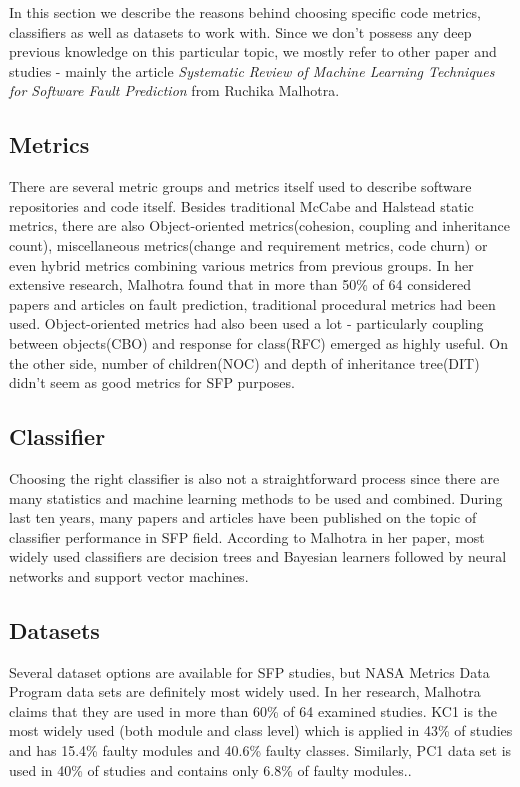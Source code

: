 In this section we describe the reasons behind choosing specific code metrics, classifiers as well as datasets to work with. Since we don't possess any deep previous knowledge on this particular topic, we mostly refer to other paper and studies - mainly the article \textit{Systematic Review of Machine Learning Techniques for Software Fault Prediction}\cite{malhotra2015systematic} from Ruchika Malhotra.

\subsection{Metrics}
There are several metric groups and metrics itself used to describe software repositories and code itself. Besides traditional McCabe and Halstead static metrics, there are also Object-oriented metrics(cohesion, coupling and inheritance count), miscellaneous metrics(change and requirement metrics, code churn) or even hybrid metrics combining various metrics from previous groups. In her extensive research, Malhotra found that in more than 50\% of 64 considered papers and articles on fault prediction, traditional procedural metrics had been used. Object-oriented metrics had also been used a lot - particularly coupling between objects(CBO) and response for class(RFC) emerged as highly useful. On the other side,  number of children(NOC) and depth of inheritance tree(DIT) didn't seem as
good metrics for SFP purposes\cite[p.~15]{malhotra2015systematic}.

\subsection{Classifier}
Choosing the right classifier is also not a straightforward process since there are many statistics and machine learning methods to be used and combined. During last ten years, many papers and articles have been published on the topic of classifier performance in SFP field. According to Malhotra in her paper, most widely used classifiers are decision trees and Bayesian learners followed by neural networks and support vector machines\cite[p.~11]{malhotra2015systematic}.

\subsection{Datasets}
Several dataset options are available for SFP studies, but NASA Metrics Data Program data sets are definitely most widely used. In her research, Malhotra claims that they are used in more than 60\% of 64 examined studies. KC1 is the most widely used (both module and class level) which is applied in 43\% of studies and
has 15.4\% faulty modules and 40.6\% faulty classes. Similarly, PC1 data set is used in 40\% of studies and contains only 6.8\% of faulty modules.\cite[p.~17]{malhotra2015systematic}.